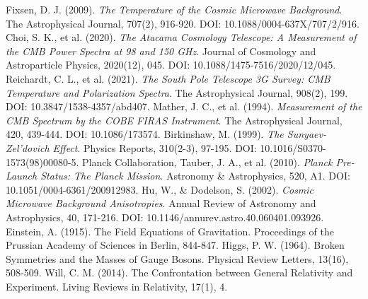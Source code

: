 \documentclass[12pt,a4paper]{article}
\begin{document}
\begin{thebibliography}{99}
		 Fixsen, D. J. (2009). \textit{The Temperature of the Cosmic Microwave Background}. The Astrophysical Journal, 707(2), 916-920. DOI: 10.1088/0004-637X/707/2/916.
		 Choi, S. K., et al. (2020). \textit{The Atacama Cosmology Telescope: A Measurement of the CMB Power Spectra at 98 and 150 GHz}. Journal of Cosmology and Astroparticle Physics, 2020(12), 045. DOI: 10.1088/1475-7516/2020/12/045.
		 Reichardt, C. L., et al. (2021). \textit{The South Pole Telescope 3G Survey: CMB Temperature and Polarization Spectra}. The Astrophysical Journal, 908(2), 199. DOI: 10.3847/1538-4357/abd407.
		 Mather, J. C., et al. (1994). \textit{Measurement of the CMB Spectrum by the COBE FIRAS Instrument}. The Astrophysical Journal, 420, 439-444. DOI: 10.1086/173574.
		 Birkinshaw, M. (1999). \textit{The Sunyaev-Zel'dovich Effect}. Physics Reports, 310(2-3), 97-195. DOI: 10.1016/S0370-1573(98)00080-5.
		 Planck Collaboration, Tauber, J. A., et al. (2010). \textit{Planck Pre-Launch Status: The Planck Mission}. Astronomy \& Astrophysics, 520, A1. DOI: 10.1051/0004-6361/200912983.
		 Hu, W., \& Dodelson, S. (2002). \textit{Cosmic Microwave Background Anisotropies}. Annual Review of Astronomy and Astrophysics, 40, 171-216. DOI: 10.1146/annurev.astro.40.060401.093926.
		 Einstein, A. (1915). The Field Equations of Gravitation. Proceedings of the Prussian Academy of Sciences in Berlin, 844-847.
		 Higgs, P. W. (1964). Broken Symmetries and the Masses of Gauge Bosons. Physical Review Letters, 13(16), 508-509.
		 Will, C. M. (2014). The Confrontation between General Relativity and Experiment. Living Reviews in Relativity, 17(1), 4.
	\end{thebibliography}
	
\end{document}
